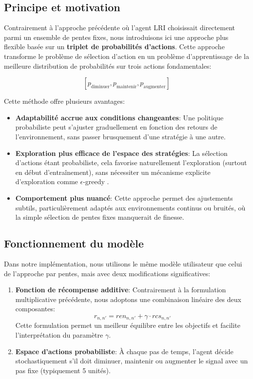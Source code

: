 \subsection{Principe et motivation}

Contrairement à l'approche précédente où l'agent LRI choisissait directement parmi un ensemble de pentes fixes, nous introduisons ici une approche plus flexible basée sur un \textbf{triplet de probabilités d'actions}. Cette approche transforme le problème de sélection d'action en un problème d'apprentissage de la meilleure distribution de probabilités sur trois actions fondamentales:

$$[p_{\text{diminuer}}, p_{\text{maintenir}}, p_{\text{augmenter}}]$$

Cette méthode offre plusieurs avantages:
\begin{itemize}
    \item \textbf{Adaptabilité accrue aux conditions changeantes}: Une politique probabiliste peut s'ajuster graduellement en fonction des retours de l'environnement, sans passer brusquement d'une stratégie à une autre.
    
    \item \textbf{Exploration plus efficace de l'espace des stratégies}: La sélection d'actions étant probabiliste, cela favorise naturellement l'exploration (surtout en début d'entraînement), sans nécessiter un mécanisme explicite d'exploration comme $\epsilon$-greedy \cite{ThePolicyGradientTheorem}.
    
    \item \textbf{Comportement plus nuancé}: Cette approche permet des ajustements subtils, particulièrement adaptés aux environnements continus ou bruités, où la simple sélection de pentes fixes manquerait de finesse.
\end{itemize}

\subsection{Fonctionnement du modèle}

Dans notre implémentation, nous utilisons le même modèle utilisateur que celui de l'approche par pentes, mais avec deux modifications significatives:

\begin{enumerate}
    \item \textbf{Fonction de récompense additive}: Contrairement à la formulation multiplicative précédente, nous adoptons une combinaison linéaire des deux composantes:
    $$r_{n,n'} = ren_{n,n'} + \gamma \cdot rcs_{n,n'}$$
    Cette formulation permet un meilleur équilibre entre les objectifs et facilite l'interprétation du paramètre $\gamma$.
    
    \item \textbf{Espace d'actions probabiliste}: À chaque pas de temps, l'agent décide stochastiquement s'il doit diminuer, maintenir ou augmenter le signal avec un pas fixe (typiquement 5 unités).
\end{enumerate}

